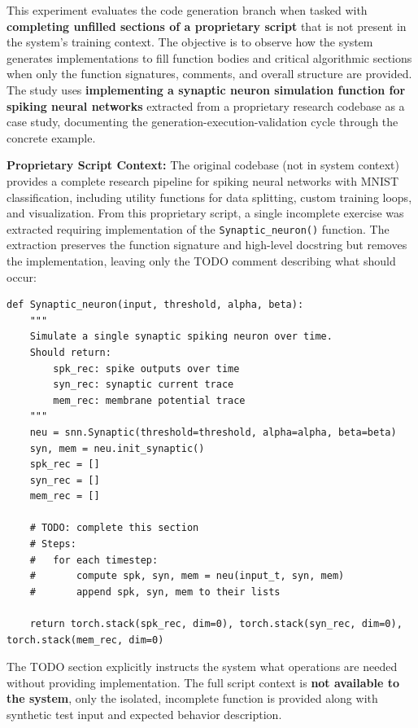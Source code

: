 This experiment evaluates the code generation branch when tasked with \textbf{completing unfilled sections of a proprietary script} that is not present in the system's training context. The objective is to observe how the system generates implementations to fill function bodies and critical algorithmic sections when only the function signatures, comments, and overall structure are provided. The study uses \textbf{implementing a synaptic neuron simulation function for spiking neural networks} extracted from a proprietary research codebase as a case study, documenting the generation-execution-validation cycle through the concrete example.

\vspace{0.3cm}

\noindent \textbf{Proprietary Script Context:} The original codebase (not in system context) provides a complete research pipeline for spiking neural networks with MNIST classification, including utility functions for data splitting, custom training loops, and visualization. From this proprietary script, a single incomplete exercise was extracted requiring implementation of the \texttt{Synaptic\_neuron()} function. The extraction preserves the function signature and high-level docstring but removes the implementation, leaving only the TODO comment describing what should occur:

\begin{lstlisting}
def Synaptic_neuron(input, threshold, alpha, beta):
    """
    Simulate a single synaptic spiking neuron over time.
    Should return:
        spk_rec: spike outputs over time
        syn_rec: synaptic current trace
        mem_rec: membrane potential trace
    """
    neu = snn.Synaptic(threshold=threshold, alpha=alpha, beta=beta)
    syn, mem = neu.init_synaptic()
    spk_rec = []
    syn_rec = []
    mem_rec = []

    # TODO: complete this section
    # Steps:
    #   for each timestep:
    #       compute spk, syn, mem = neu(input_t, syn, mem)
    #       append spk, syn, mem to their lists

    return torch.stack(spk_rec, dim=0), torch.stack(syn_rec, dim=0), torch.stack(mem_rec, dim=0)
\end{lstlisting}

The TODO section explicitly instructs the system what operations are needed without providing implementation. The full script context is \textbf{not available to the system}, only the isolated, incomplete function is provided along with synthetic test input and expected behavior description.

